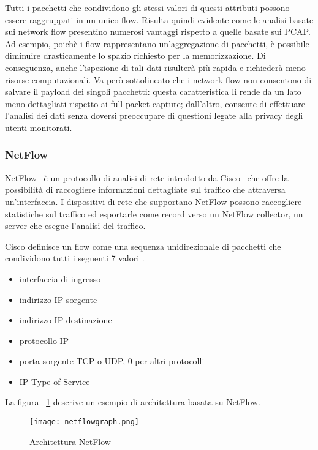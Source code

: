 \documentclass[../main.tex]{subfiles}
\begin{document}
Tutti i pacchetti che condividono gli stessi valori di questi attributi possono essere raggruppati in un unico flow. Risulta quindi evidente come le analisi basate sui network flow presentino numerosi vantaggi rispetto a quelle basate sui PCAP. Ad esempio, poichè i flow rappresentano un'aggregazione di pacchetti, è possibile diminuire drasticamente lo spazio richiesto per la memorizzazione. Di conseguenza, anche l'ispezione di tali dati risulterà più rapida e richiederà meno risorse computazionali. Va però sottolineato che i network flow non consentono di salvare il payload dei singoli pacchetti: questa caratteristica li rende da un lato meno dettagliati rispetto ai full packet capture; dall'altro, consente di effettuare l'analisi dei dati senza doversi preoccupare di questioni legate alla privacy degli utenti monitorati.

\subsubsection{NetFlow}
NetFlow~\cite{netflowDef} è un protocollo di analisi di rete introdotto da Cisco~\cite{netflowdef2} che offre la possibilità di raccogliere informazioni dettagliate sul traffico che attraversa un'interfaccia. I dispositivi di rete che supportano NetFlow possono raccogliere statistiche sul traffico ed esportarle come record verso un NetFlow collector, un server che esegue l'analisi del traffico.

Cisco definisce un flow come una sequenza unidirezionale di pacchetti che condividono tutti i seguenti 7 valori \cite{netflowDef}.

\begin{itemize}
				\item interfaccia di ingresso
				\item indirizzo IP sorgente
				\item indirizzo IP destinazione
				\item protocollo IP
				\item porta sorgente TCP o UDP, 0 per altri protocolli
				\item IP Type of Service
\end{itemize}

La figura ~\ref{fig:architetturaNetflow} descrive un esempio di architettura basata su NetFlow. 

\begin{figure}[H]
\centering
\texttt{[image: netflowgraph.png]}
\caption{Architettura NetFlow}
\label{fig:architetturaNetflow}
\end{figure}
\end{document}
